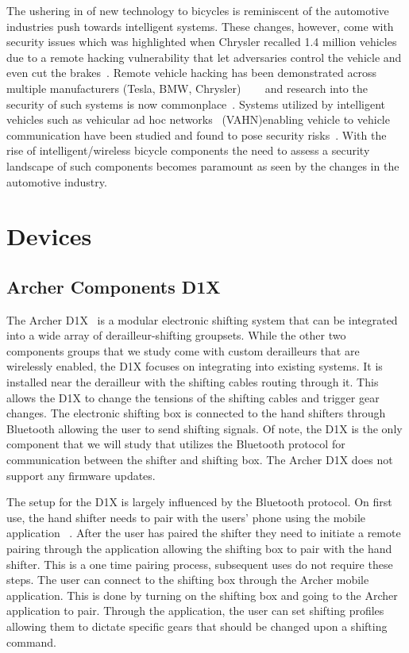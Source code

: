\documentclass[letterpaper,twocolumn,10pt]{article}
\begin{document}
The ushering in of new technology to bicycles is reminiscent of the automotive industries push towards intelligent systems. These changes, however, come with security issues which was highlighted when Chrysler recalled 1.4 million vehicles due to a remote hacking vulnerability that let adversaries control the vehicle and even cut the brakes~\cite{ChryslerRecall}. Remote vehicle hacking has been demonstrated across multiple manufacturers (Tesla, BMW, Chrysler) ~\cite{Tesla}~\cite{BMW}~\cite{Chrysler} and research into the security of such systems is now commonplace~\cite{dibaei2019overview}. Systems utilized by intelligent vehicles such as vehicular ad hoc networks~\cite{SAKIZ201733} (VAHN)enabling vehicle to vehicle communication have been studied and found to pose security risks~\cite{ SAKIZ201733}. With the rise of intelligent/wireless bicycle components the need to assess a security landscape of such components becomes paramount as seen by the changes in the automotive industry.


\section{Devices}
\subsection{Archer Components D1X}

The Archer D1X~\cite{Archer} is a modular electronic shifting system that can be integrated into a wide array of derailleur-shifting groupsets. While the other two components groups that we study come with custom derailleurs that are wirelessly enabled, the D1X focuses on integrating into existing systems. It is installed near the derailleur with the shifting cables routing through it. This allows the D1X to change the tensions of the shifting cables and trigger gear changes. The electronic shifting box is connected to the hand shifters through Bluetooth allowing the user to send shifting signals. Of note, the D1X is the only component that we will study that utilizes the Bluetooth protocol for communication between the shifter and shifting box. The Archer D1X does not support any firmware updates.

The setup for the D1X is largely influenced by the Bluetooth protocol. On first use, the hand shifter needs to pair with the users' phone using the mobile application~ \cite{ArcherApp}. After the user has paired the shifter they need to initiate a remote pairing through the application allowing the shifting box to pair with the hand shifter. This is a one time pairing process, subsequent uses do not require these steps. The user can connect to the shifting box through the Archer mobile application. This is done by turning on the shifting box and going to the Archer application to pair. Through the application, the user can set shifting profiles allowing them to dictate specific gears that should be changed upon a shifting command.
\end{document}
